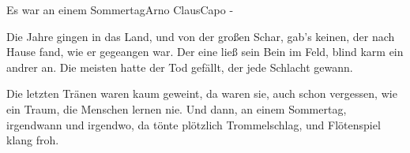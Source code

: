 \begin{song}{Es war an einem Sommertag}{Arno Claus}{Capo -}
 

Die Jahre gingen in das Land, und von der großen Schar,
gab's keinen, der nach Hause fand, wie er gegeangen war.
Der eine ließ sein Bein im Feld, blind karm ein andrer an.
Die meisten hatte der Tod gefällt, der jede Schlacht gewann.

 

Die letzten Tränen waren kaum geweint, da waren sie,
auch schon vergessen, wie ein Traum, die Menschen lernen nie.
Und dann, an einem Sommertag, irgendwann und irgendwo,
da tönte plötzlich Trommelschlag, und Flötenspiel klang froh.

 

\end{song}